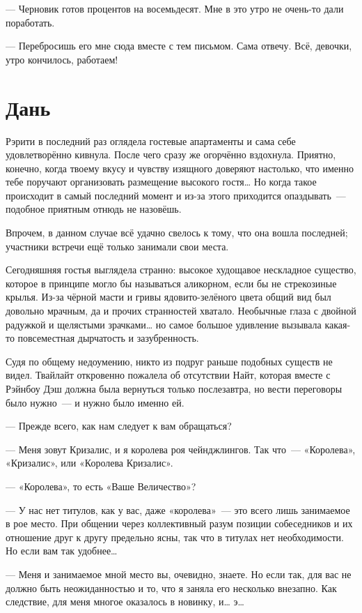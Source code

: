 \documentclass[twoside,a5paper,12pt]{extbook}
\begin{document}
— Черновик готов процентов на восемьдесят. Мне в это утро не очень-то дали поработать.

— Перебросишь его мне сюда вместе с тем письмом. Сама отвечу. Всё, девочки, утро кончилось, работаем!

\chapter{Дань}

Рэрити в последний раз оглядела гостевые апартаменты и сама себе удовлетворённо кивнула. После чего сразу же огорчённо вздохнула. Приятно, конечно, когда твоему вкусу и чувству изящного доверяют настолько, что именно тебе поручают организовать размещение высокого гостя… Но когда такое происходит в самый последний момент и из-за этого приходится опаздывать — подобное приятным отнюдь не назовёшь.

Впрочем, в данном случае всё удачно свелось к тому, что она вошла последней; участники встречи ещё только занимали свои места.

Сегодняшняя гостья выглядела странно: высокое худощавое нескладное существо, которое в принципе могло бы называться аликорном, если бы не стрекозиные крылья. Из-за чёрной масти и гривы ядовито-зелёного цвета общий вид был довольно мрачным, да и прочих странностей хватало. Необычные глаза с двойной радужкой и щелястыми зрачками… но самое большое удивление вызывала какая-то повсеместная дырчатость и зазубренность.

Судя по общему недоумению, никто из подруг раньше подобных существ не видел. Твайлайт откровенно пожалела об отсутствии Найт, которая вместе с Рэйнбоу Дэш должна была вернуться только послезавтра, но вести переговоры было нужно — и нужно было именно ей.

— Прежде всего, как нам следует к вам обращаться?

— Меня зовут Кризалис, и я королева роя чейнджлингов. Так что — «Королева», «Кризалис», или «Королева Кризалис».

— «Королева», то есть «Ваше Величество»?

— У нас нет титулов, как у вас, даже «королева» — это всего лишь занимаемое в рое место. При общении через коллективный разум позиции собеседников и их отношение друг к другу предельно ясны, так что в титулах нет необходимости. Но если вам так удобнее…

— Меня и занимаемое мной место вы, очевидно, знаете. Но если так, для вас не должно быть неожиданностью и то, что я заняла его несколько внезапно. Как следствие, для меня многое оказалось в новинку, и… э…
\end{document}
